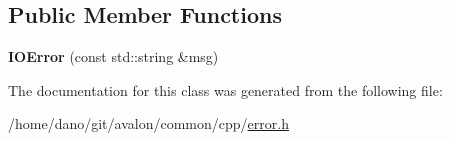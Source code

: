 \subsection*{Public Member Functions}
\begin{DoxyCompactItemize}
\item 
\mbox{\label{classtcf_1_1error_1_1IOError_aa5a44e95cd6593e640b32e810591c608}} 
{\bfseries I\+O\+Error} (const std\+::string \&msg)
\end{DoxyCompactItemize}


The documentation for this class was generated from the following file\+:\begin{DoxyCompactItemize}
\item 
/home/dano/git/avalon/common/cpp/\hyperlink{error_8h}{error.\+h}\end{DoxyCompactItemize}
